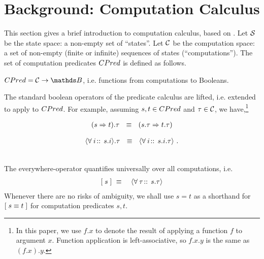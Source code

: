 
\section{Background: Computation Calculus}
\label{sec:background}

This section gives a brief introduction to computation calculus, based
on \cite{Dijkstra:1998p1128}.  Let $\mathcal{S}$ be the state space: a
non-empty set of ``states''.  Let $\mathcal{C}$ be the computation
space: a set of non-empty (finite or infinite) sequences of states
(``computations'').  The set of computation predicates $CPred$ 
is defined as follows.
%
\begin{Definition}
  $\CPred = \Computation \rightarrow \BOOL$, i.e. functions from
  computations to Booleans.
\end{Definition}

The standard boolean operators of the predicate calculus are lifted,
i.e. extended to apply to $CPred$. For example, assuming $s, t \in
CPred$ and $\tau \in \mathcal{C}$, we have,\footnote{
  In this paper, we use $f.x$ to denote the result of applying a
  function $f$ to argument $x$.  Function application is
  left-associative, so $f.x.y$ is the same as $(f.x).y$.
}%
%

  \begin{minipage}{0.45\linewidth}
    \begin{eqnarray}
(s \Rightarrow t).\tau  ~~\equiv~~  (s.\tau \Rightarrow
t.\tau) \label{eq:comp-impl} 
    \end{eqnarray}
  \end{minipage}
  \hfill
  \begin{minipage}{0.45\linewidth}
    \begin{eqnarray}
{ \langle \forall \:i\!:\, \!:\, s.i \rangle }.\tau  ~~\equiv~~
{ \langle \forall \:i\!:\, \!:\, s.i.\tau \rangle }~. \label{eq:comp-forall}
    \end{eqnarray}
  \end{minipage}
\\

The everywhere-operator quantifies universally over all
computations, i.e.
%
\begin{eqnarray} 
[\; s \;] & ~\equiv ~& { \langle \forall \:\tau\!:\, \!:\, s.\tau \rangle } \label{eq:comp-ew}
\end{eqnarray}
%
Whenever there are no risks of ambiguity, we
shall use $s = t$ as a shorthand for $[\; s \equiv t \;]$ for computation
predicates $s, t$.

